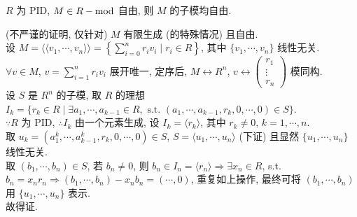 \documentclass{note}
\begin{document}
\begin{thm}[(课本定理 6.5)]
    $R$ 为 PID, $M\in R-\operatorname{mod}$ 自由, 则 $M$ 的子模均自由.
\end{thm}
\begin{pf}
    (不严谨的证明, 仅针对) $M$ 有限生成 (的特殊情况) 且自由.\\
    设 $M=\langle\langle v_1,\cdots,v_n\rangle\rangle=\left\{\sum_{i=0}^nr_iv_i\mid r_i\in R\right\}$, 其中 $\{v_1,\cdots,v_n\}$ 线性无关.\\
    $\forall v\in M$, $v=\sum_{i=1}^nr_iv_i$ 展开唯一, 定序后, $M\longleftrightarrow R^{n}$, $v\longleftrightarrow\begin{pmatrix}
        r_1\\
        \vdots\\
        r_n
    \end{pmatrix}$ 模同构.\\
    设 $S$ 是 $R^n$ 的子模, 取 $R$ 的理想 $I_k=\{r_k\in R\mid\exists a_1,\cdots,a_{k-1}\in R,\text{ s.t. }(a_1,\cdots,a_{k-1},r_k,0,\cdots,0)\in S\}$.\\
    $\because R$ 为 PID, $\therefore I_k$ 由一个元素生成, 设 $I_k=\langle r_k\rangle$, 其中 $r_k\neq 0$, $k=1,\cdots,n$.\\
    取 $u_k=(a_1^k,\cdots,a_{k-1}^k,r_k,0,\cdots,0)\in S$, $S=\langle u_1,\cdots,u_n\rangle$ (下证) 且显然 $\{u_1,\cdots,u_n\}$ 线性无关.\\
    取 $(b_1,\cdots,b_n)\in S$, 若 $b_n\neq 0$, 则 $b_n\in I_n=\langle r_n\rangle\Longrightarrow\exists x_n\in R$, s.t. $b_n=x_nr_n\Longrightarrow(b_1,\cdots,b_n)-x_nb_n=(\cdots,0)$,
    重复如上操作, 最终可将 $(b_1,\cdots,b_n)$ 用 $\{u_1,\cdots,u_n\}$ 表示.\\
    故得证.
\end{pf}
\end{document}
